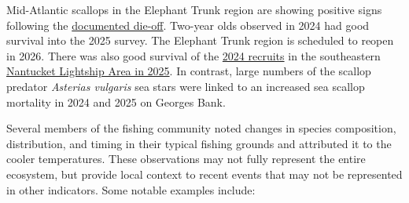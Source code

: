 \documentclass[
  10pt,
]{article}
\begin{document}
Mid-Atlantic scallops in the Elephant Trunk region are showing positive
signs following the
\href{https://noaa-edab.github.io/catalog/observation_synthesis_2023.html}{documented
die-off}. Two-year olds observed in 2024 had good survival into the 2025
survey. The Elephant Trunk region is scheduled to reopen in 2026. There
was also good survival of the
\href{https://noaa-edab.github.io/catalog/observation_synthesis_2024.html}{2024
recruits} in the southeastern
\href{https://noaa-edab.github.io/catalog/observation_synthesis_2025.html}{Nantucket
Lightship Area in 2025}. In contrast, large numbers of the scallop
predator \emph{Asterias vulgaris} sea stars were linked to an increased
sea scallop mortality in 2024 and 2025 on Georges Bank.

Several members of the fishing community noted changes in species
composition, distribution, and timing in their typical fishing grounds
and attributed it to the cooler temperatures. These observations may not
fully represent the entire ecosystem, but provide local context to
recent events that may not be represented in other indicators. Some
notable examples include:
\end{document}
